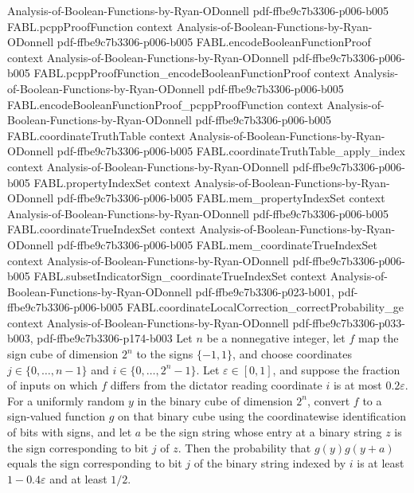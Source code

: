 \begin{theorem}
  {Analysis-of-Boolean-Functions-by-Ryan-ODonnell}
  {pdf-ffbe9c7b3306-p006-b005}
\proofstep
  {FABL.pcppProofFunction}
  {context}
  {Analysis-of-Boolean-Functions-by-Ryan-ODonnell}
  {pdf-ffbe9c7b3306-p006-b005}
\proofstep
  {FABL.encodeBooleanFunctionProof}
  {context}
  {Analysis-of-Boolean-Functions-by-Ryan-ODonnell}
  {pdf-ffbe9c7b3306-p006-b005}
\proofstep
  {FABL.pcppProofFunction_encodeBooleanFunctionProof}
  {context}
  {Analysis-of-Boolean-Functions-by-Ryan-ODonnell}
  {pdf-ffbe9c7b3306-p006-b005}
\proofstep
  {FABL.encodeBooleanFunctionProof_pcppProofFunction}
  {context}
  {Analysis-of-Boolean-Functions-by-Ryan-ODonnell}
  {pdf-ffbe9c7b3306-p006-b005}
\proofstep
  {FABL.coordinateTruthTable}
  {context}
  {Analysis-of-Boolean-Functions-by-Ryan-ODonnell}
  {pdf-ffbe9c7b3306-p006-b005}
\proofstep
  {FABL.coordinateTruthTable_apply_index}
  {context}
  {Analysis-of-Boolean-Functions-by-Ryan-ODonnell}
  {pdf-ffbe9c7b3306-p006-b005}
\proofstep
  {FABL.propertyIndexSet}
  {context}
  {Analysis-of-Boolean-Functions-by-Ryan-ODonnell}
  {pdf-ffbe9c7b3306-p006-b005}
\proofstep
  {FABL.mem_propertyIndexSet}
  {context}
  {Analysis-of-Boolean-Functions-by-Ryan-ODonnell}
  {pdf-ffbe9c7b3306-p006-b005}
\proofstep
  {FABL.coordinateTrueIndexSet}
  {context}
  {Analysis-of-Boolean-Functions-by-Ryan-ODonnell}
  {pdf-ffbe9c7b3306-p006-b005}
\proofstep
  {FABL.mem_coordinateTrueIndexSet}
  {context}
  {Analysis-of-Boolean-Functions-by-Ryan-ODonnell}
  {pdf-ffbe9c7b3306-p006-b005}
\proofstep
  {FABL.subsetIndicatorSign_coordinateTrueIndexSet}
  {context}
  {Analysis-of-Boolean-Functions-by-Ryan-ODonnell}
  {pdf-ffbe9c7b3306-p023-b001,
    pdf-ffbe9c7b3306-p006-b005}
\proofstep
  {FABL.coordinateLocalCorrection_correctProbability_ge}
  {context}
  {Analysis-of-Boolean-Functions-by-Ryan-ODonnell}
  {pdf-ffbe9c7b3306-p033-b003,
    pdf-ffbe9c7b3306-p174-b003}
Let $n$ be a nonnegative integer, let $f$ map the sign cube of dimension $2^n$ to the
signs $\{-1,1\}$, and choose coordinates $j\in\{0,\ldots,n-1\}$ and
$i\in\{0,\ldots,2^n-1\}$. Let $\varepsilon\in[0,1]$, and suppose the fraction of inputs
on which $f$ differs from the dictator reading coordinate $i$ is at most
$0.2\varepsilon$. For a uniformly random $y$ in the binary cube of dimension $2^n$,
convert $f$ to a sign-valued function $g$ on that binary cube using the coordinatewise
identification of bits with signs, and let $a$ be the sign string whose entry at a
binary string $z$ is the sign corresponding to bit $j$ of $z$. Then the probability that
$g(y)g(y+a)$ equals the sign corresponding to bit $j$ of the binary string indexed by
$i$ is at least $1-0.4\varepsilon$ and at least $1/2$.
\end{theorem}

